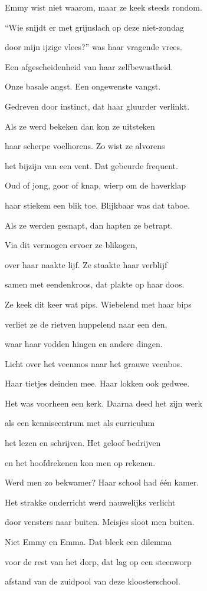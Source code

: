 Emmy wist niet waarom,
maar ze keek steeds rondom.

“Wie snijdt er met grijnslach
op deze niet-zondag

door mijn ijzige vlees?”
was haar vragende vrees.

Een afgescheidenheid
van haar zelfbewustheid.

Onze basale angst.
Een ongewenste vangst.

Gedreven door instinct,
dat haar gluurder verlinkt.

Als ze werd bekeken
dan kon ze uitsteken

haar scherpe voelhorens.
Zo wist ze alvorens

het bijzijn van een vent.
Dat gebeurde frequent.

Oud of jong, goor of knap,
wierp om de haverklap

haar stiekem een blik toe.
Blijkbaar was dat taboe.

Als ze werden gesnapt,
dan hapten ze betrapt.

Via dit vermogen
ervoer ze blikogen,

over haar naakte lijf.
Ze staakte haar verblijf

samen met eendenkroos,
dat plakte op haar doos.

Ze keek dit keer wat pips.
Wiebelend met haar bips

verliet ze de rietven
huppelend naar een den,

waar haar vodden hingen
en andere dingen.

Licht over het veenmos
naar het grauwe veenbos.

Haar tietjes deinden mee.
Haar lokken ook gedwee.

Het was voorheen een kerk.
Daarna deed het zijn werk

als een kenniscentrum
met als curriculum

het lezen en schrijven.
Het geloof bedrijven

en het hoofdrekenen
kon men op rekenen.

Werd men zo bekwamer?
Haar school had één kamer.

Het strakke onderricht
werd nauwelijks verlicht

door vensters naar buiten.
Meisjes sloot men buiten.

Niet Emmy en Emma.
Dat bleek een dilemma

voor de rest van het dorp,
dat lag op een steenworp

afstand van de zuidpool
van deze kloosterschool.


